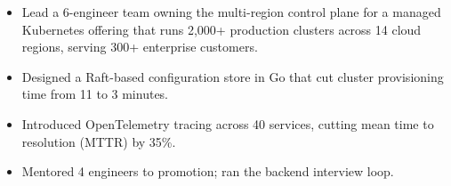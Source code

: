 \begin{itemize}
  \item Lead a 6-engineer team owning the multi-region control plane for a managed Kubernetes offering that runs 2,000+ production clusters across 14 cloud regions, serving 300+ enterprise customers.
  \item Designed a Raft-based configuration store in Go that cut cluster provisioning time from 11 to 3 minutes.
  \item Introduced OpenTelemetry tracing across 40 services, cutting mean time to resolution (MTTR) by 35\%.
  \item Mentored 4 engineers to promotion; ran the backend interview loop.
\end{itemize}

\vspace{2pt}
\smallskip


